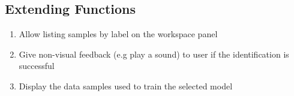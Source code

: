 
\subsection{Extending Functions}
\begin{enumerate}[resume*]
    \item Allow listing samples by label on the workspace panel
    \item \label{/F480/} Give non-visual feedback (e.g play a sound) to user if the identification is successful
    \item Display the data samples used to train the selected model
\end{enumerate}